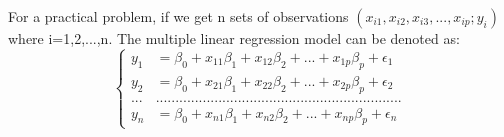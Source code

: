 \documentclass[a4paper]{article}
\begin{document}
For a practical problem, if we get n sets of observations $(x_{i1},x_{i2},x_{i3},...,x_{ip};y_i)$ where i=1,2,...,n. The multiple linear regression model can be denoted as: 
\begin{equation*}
	\left\{
	\begin{aligned}
	y_1 & = \beta_0+x_{11}\beta_1+x_{12}\beta_2+...+x_{1p}\beta_p+\epsilon_1\\
	y_2 & =\beta_0+x_{21}\beta_1+x_{22}\beta_2+...+x_{2p}\beta_p+\epsilon_2\\
	... & ... ... ... ... ... ... ... ... ... ... ... ... ... ... ... ... ... ... ... ... ... \\
	y_n & =\beta_0+x_{n1}\beta_1+x_{n2}\beta_2+...+x_{np}\beta_p+\epsilon_n
	\end{aligned}
		\right.
\end{equation*}
\end{document}
